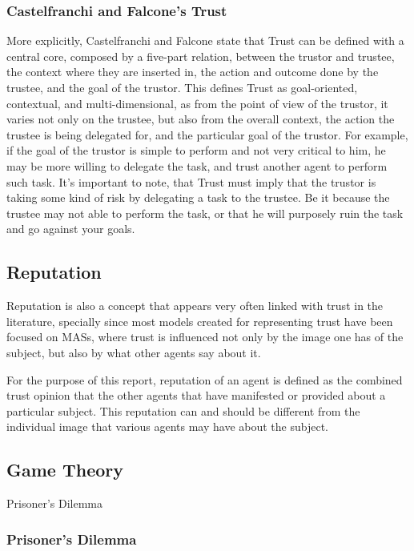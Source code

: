 \subsubsection{Castelfranchi and Falcone's Trust}
\label{subsubsec:CastelfranchiTrust}
More explicitly, Castelfranchi and Falcone\cite{Castelfranchi1998} state that Trust can be defined with a central core, composed by a five-part relation, between the trustor and trustee, the context where they are inserted in, the action and outcome done by the trustee, and the goal of the trustor. This defines Trust as goal-oriented, contextual, and multi-dimensional, as from the point of view of the trustor, it varies not only on the trustee, but also from the overall context, the action the trustee is being delegated for, and the particular goal of the trustor. For example, if the goal of the trustor is simple to perform and not very critical to him, he may be more willing to delegate the task, and trust another agent to perform such task. It's important to note, that Trust must imply that the trustor is taking some kind of risk by delegating a task to the trustee. Be it because the trustee may not able to perform the task, or that he will purposely ruin the task and go against your goals.




\subsection{Reputation}
\label{subsec:Reputation}
Reputation is also a concept that appears very often linked with trust in the literature, specially since most models created for representing trust have been focused on \acp{MAS}, where trust is influenced not only by the image one has of the subject, but also by what other agents say about it.

For the purpose of this report, reputation of an agent is defined as the combined trust opinion that the other agents that have manifested or provided about a particular subject. This reputation can and should be different from the individual image that various agents may have about the subject.


\subsection{Game Theory}
\label{subsec:GameTheory}
Prisoner's Dilemma

\subsubsection{Prisoner's Dilemma}
\label{subsubsec:PrisonersDilemma}
